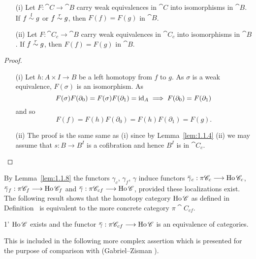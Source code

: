 \documentclass[../main]{subfiles}
\begin{document}
\begin{lemma}
\label{lem:1.1.8}
\begin{itemize}
    \item[(i)] Let $F : \cat C \longrightarrow \cat B$ carry weak equivalences in $\cat C$ into isomorphisms in $\cat B$. If $f \overset{l}{\sim} g$ or $f \overset{r}{\sim} g$, then $F(f) = F(g)$ in $\cat B$.
    \item[(ii)] Let $F : \cat C_c \longrightarrow \cat B$ carry weak equivalences in $\cat C_c$ into isomorphisms in $\cat B$. If $f \overset{r}{\sim} g$, then $F(f) = F(g)$ in $\cat B$. 
\end{itemize} 
\end{lemma} 

\begin{proof}
\begin{itemize}
    \item[(i)] Let $h : A \times I \longrightarrow B$ be a left homotopy from $f$ to $g$. As $\sigma$ is a weak equivalence, $F(\sigma)$ is an isomorphism. As \[F(\sigma) F(\partial_0) = F(\sigma) F(\partial_1) = \operatorname{id}_A\implies F(\partial_0) = F(\partial_1)\] and so \[F(f) = F(h) F(\partial_0) = F(h) F(\partial_1) = F(g).\]
    \item[(ii)] The proof is the same same as (i) since by Lemma~\ref{lem:1.1.4} (ii) we may assume that $s : B \longrightarrow B^I$ is a cofibration and hence $B^I$ is in $\cat C_c$. 
\end{itemize} 
\end{proof} 

By Lemma~\ref{lem:1.1.8} the functors $\gamma_c$, $\gamma_f$, $\gamma$ induce functors $\xoverline \gamma_c : \pi \cat C_c \longrightarrow \Ho \cat C_c$, $\xoverline \gamma_f : \pi \cat C_f \longrightarrow \Ho \cat C_f$ and $\xoverline \gamma : \pi \cat C_{cf} \longrightarrow \Ho \cat C$, provided these localizations exist. The following result shows that the homotopy category $\operatorname{Ho} \mathscr{C}$ as defined in Definition~ is equivalent to the more concrete category $\pi \cat C_{cf}$. 

\begin{customthm}{1'}\label{thm:1'}
$\operatorname{Ho} \mathscr{C}$ exists and the functor $\xoverline \gamma : \pi \cat C_{cf} \longrightarrow \Ho \cat C$ is an equivalence of categories. 
\end{customthm} 

This is included in the following more complex assertion which is presented for the purpose of comparison with (Gabriel--Zisman \cite{gabriel_calculus_1967}).
\end{document}
